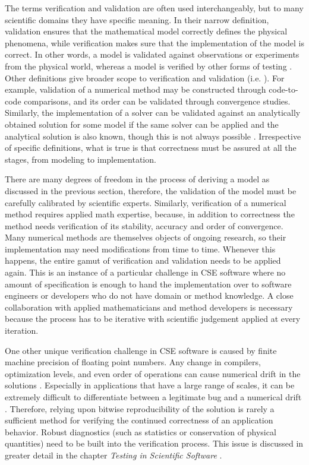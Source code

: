The terms verification and validation are often used interchangeably,
but to many scientific domains they have specific meaning.   
In their narrow definition, validation ensures that the mathematical
model correctly defines the physical phenomena, while verification
makes sure that the implementation of the model is correct. In other
words, a model is validated against observations or experiments from
the physical world, whereas a model is verified by other forms of
testing \cite{oberkampf2002verification}.   Other definitions give
broader scope to  verification and validation (i.e. \cite{sargent1998verification}). For
example, validation of a numerical method may be constructed through
code-to-code comparisons, and its order can be validated through
convergence studies. Similarly, the implementation of a solver can be
validated against an analytically obtained solution for some model if
the same solver can be applied and the analytical solution is also
known, though this is not always possible
\cite{oberkampf2010verification}.  Irrespective of  specific
definitions, what is true is that   correctness must be assured at all
the stages, from modeling to implementation.     

There are many degrees of freedom in the process of deriving a
model as discussed in the previous section, therefore, the validation of the
model must be carefully calibrated by scientific experts. Similarly,
verification of a numerical method requires applied math expertise,
because, in addition to correctness the method needs verification of its stability, accuracy and
order of convergence. Many numerical methods 
are themselves objects of ongoing research, so their
implementation may need modifications from time to time. Whenever
this happens, the entire gamut of verification and validation needs to
be applied again. This is an instance of a particular challenge in 
CSE software where no amount of specification is enough to hand the
implementation over to software engineers or developers who do not
have domain or method knowledge. A close collaboration with applied
mathematicians and method developers is necessary because the process
has to be iterative with scientific judgement applied at every
iteration.  

One other unique verification challenge in CSE software is caused by 
finite machine precision of floating point numbers. Any change in
compilers, optimization levels, and even order of operations can cause
numerical drift in the solutions
\cite{monniaux2008pitfalls}. Especially in applications that have a
large range of scales, it can be extremely difficult to differentiate
between a legitimate bug and a numerical drift \cite{Dubey2015}. Therefore, relying
upon bitwise reproducibility of the solution is rarely a sufficient
method for verifying the continued correctness of an application
behavior. Robust diagnostics (such as statistics or conservation of
physical quantities) need to be built into the verification process.
This issue is discussed in greater detail in the chapter {\em Testing
  in Scientific Software} .  

